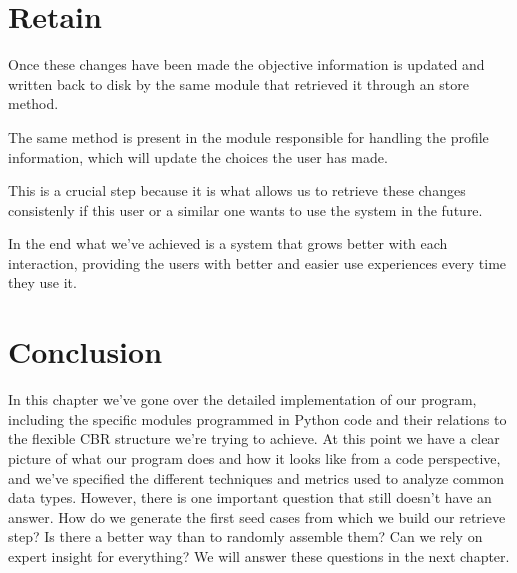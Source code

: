 \section{Retain}
\label{cap6:sec:retain}

\begin{figure}[!htb]
    \caption{\label{fig:shutdown}}
\end{figure}

Once these changes have been made the objective information is updated and written back to disk by the same module that retrieved it through an store method.

The same method is present in the module responsible for handling the profile information, which will update the choices the user has made.

This is a crucial step because it is what allows us to retrieve these changes consistenly if this user or a similar one wants to use the system in the future.

In the end what we've achieved is a system that grows better with each interaction, providing the users with better and easier use experiences every time they use it.

\section{Conclusion}
In this chapter we've gone over the detailed implementation of our program, including the specific modules programmed in Python code and their relations to the flexible CBR structure we're trying to achieve.
At this point we have a clear picture of what our program does and how it looks like from a code perspective, and we've specified the different techniques and metrics used to analyze common data types.
However, there is one important question that still doesn't have an answer. How do we generate the first seed cases from which we build our retrieve step? Is there a better way than to randomly assemble them? Can we rely on expert insight for everything? We will answer these questions in the next chapter.

\medskip
